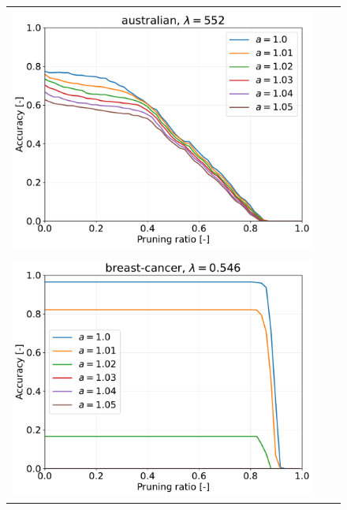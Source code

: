 \begin{figure}[H]
\begin{tabular}{ccc}
		&
		\begin{minipage}[b]{0.3\hsize}\centering {\small Dataset: australian, $\lambda=n$}\\\includegraphics[width=0.8\hsize]{fig/australian/kernel_ss_screening_rate_lam552_x_n_y_etest.pdf}\end{minipage}
		\\
		\begin{minipage}[b]{0.3\hsize}\centering {\small Dataset: breast-cancer, $\lambda=n \cdot 10^{-3}$}\\\includegraphics[width=0.8\hsize]{fig/breast/kernel_ss_screening_rate_lam0.546_x_n_y_etest.pdf}\end{minipage}
		&

\end{tabular}
\end{figure}
